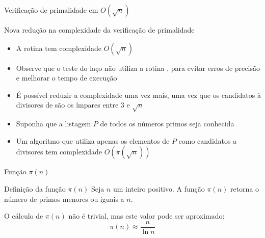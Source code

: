 \begin{frame}[fragile]{Verificação de primalidade em $O(\sqrt{n})$}
\end{frame}

\begin{frame}[fragile]{Nova redução na complexidade da verificação de primalidade}

    \begin{itemize}
        \item A rotina  tem complexidade $O(\sqrt{n})$

        \item Observe que o teste do laço não utiliza a rotina , para evitar 
            erros de precisão e melhorar o tempo de execução

        \item É possível reduzir a complexidade uma vez mais, uma vez que os candidatos à 
            divisores de  são os ímpares entre 3 e $\sqrt{n}$

        \item Suponha que a listagem $P$ de todos os números primos seja conhecida

        \item Um algoritmo que utiliza apenas os elementos de $P$
            como candidatos a divisores tem complexidade $O(\pi(\sqrt{n}))$
    \end{itemize}

\end{frame}


\begin{frame}[fragile]{Função $\pi(n)$}

    \begin{block}{Definição da função $\pi(n)$}
        Seja $n$ um inteiro positivo. A função $\pi(n)$ retorna o número de primos menores
        ou iguais a $n$.
    \end{block}

    \vspace{0.2in}

    O cálculo de $\pi(n)$ não é trivial, mas este valor pode ser aproximado:
    $$
        \pi(n) \approx \frac{n}{\ln n}
    $$

\end{frame}

